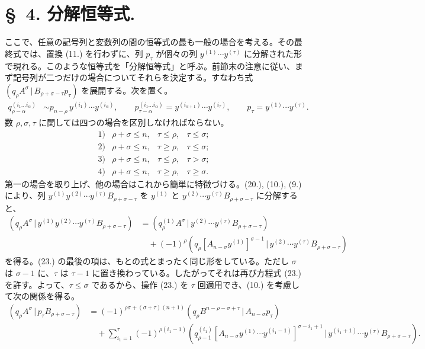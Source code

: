 \documentclass[11pt]{article}
\newcommand{\pair}[2]{(#1\,|\,#2)}
\begin{document}
\section*{\S\ 4. 分解恒等式.}
ここで、任意の記号列と変数列の間の恒等式の最も一般の場合を考える。その最終式では、置換 (11.) を行わずに、列 $p_\tau$ が個々の列 $y^{(1)}\cdots y^{(\tau)}$ に分解された形で現れる。このような恒等式を「分解恒等式」と呼ぶ。前節末の注意に従い、まず記号列が二つだけの場合についてそれらを決定する。すなわち式 $\pair{q_\rho A^\sigma}{B_{\rho+\sigma-\tau}p_\tau}$ を展開する。次を置く。
\begin{equation}
\begin{aligned}
q_{\rho-\alpha}^{(i_1\ldots i_\alpha)}&\sim p_{n-\rho}\,y^{(i_1)}\cdots y^{(i_\alpha)},\qquad
p_{\tau-\alpha}^{(i_1\ldots i_\alpha)}=y^{(i_{\alpha+1})}\cdots y^{(i_\tau)},\qquad
p_\tau=y^{(1)}\cdots y^{(\tau)}.
\end{aligned}
\tag{22}
\end{equation}
数 $\rho,\sigma,\tau$ に関しては四つの場合を区別しなければならない。
\[
\begin{array}{llll}
1)&\rho+\sigma\le n,& \tau\le\rho,& \tau\le\sigma;\\[2pt]
2)&\rho+\sigma\le n,& \tau\ge\rho,& \tau\le\sigma;\\[2pt]
3)&\rho+\sigma\le n,& \tau\le\rho,& \tau>\sigma;\\[2pt]
4)&\rho+\sigma\le n,& \tau\ge\rho,& \tau\ge\sigma.
\end{array}
\]
第一の場合を取り上げ、他の場合はこれから簡単に特徴づける。(20.), (10.), (9.) により、列 $y^{(1)}y^{(2)}\cdots y^{(\tau)}B_{\rho+\sigma-\tau}$ を $y^{(1)}$ と $y^{(2)}\cdots y^{(\tau)}B_{\rho+\sigma-\tau}$ に分解すると、
\begin{equation}
\begin{aligned}
\pair{q_\rho A^\sigma}{y^{(1)}y^{(2)}\cdots y^{(\tau)}B_{\rho+\sigma-\tau}}
&=\pair{q_\rho^{(1)}A^\sigma}{y^{(2)}\cdots y^{(\tau)}B_{\rho+\sigma-\tau}}\\
&\quad+(-1)^\rho\pair{q_\rho[A_{n-\sigma}y^{(1)}]^{\sigma-1}}{y^{(2)}\cdots y^{(\tau)}B_{\rho+\sigma-\tau}}
\end{aligned}
\tag{23}
\end{equation}
を得る。(23.) の最後の項は、もとの式とまったく同じ形をしている。ただし $\sigma$ は $\sigma-1$ に、$\tau$ は $\tau-1$ に置き換わっている。したがってそれは再び方程式 (23.) を許す。よって、$\tau\le\sigma$ であるから、操作 (23.) を $\tau$ 回適用でき、(10.) を考慮して次の関係を得る。
\begin{equation}
\begin{aligned}
\pair{q_\rho A^\sigma}{p_\tau B_{\rho+\sigma-\tau}}
&=(-1)^{\rho\sigma+(\sigma+\tau)(n+1)}
  \pair{q_\rho B^{n-\rho-\sigma+\tau}}{A_{n-\sigma}p_\tau}\\
&\quad+\sum_{i_1=1}^{\tau}(-1)^{\rho(i_1-1)}
 \pair{q_{\rho-1}^{(i_1)}[A_{n-\sigma}y^{(1)}\cdots y^{(i_1-1)}]^{\sigma-i_1+1}}
 {y^{(i_1+1)}\cdots y^{(\tau)}B_{\rho+\sigma-\tau}}.
\end{aligned}
\tag{24}
\end{equation}
\end{document}
